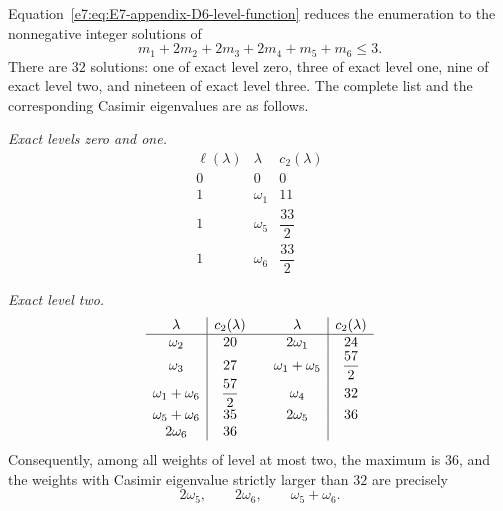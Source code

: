 \documentclass[11pt,reqno]{amsart}
\theoremstyle{definition}
\theoremstyle{remark}
\begin{document}
Equation~\eqref{e7:eq:E7-appendix-D6-level-function} reduces the enumeration
to the nonnegative integer solutions of
\[
  m_1+2m_2+2m_3+2m_4+m_5+m_6\le3.
\]
There are $32$ solutions: one of exact level zero, three of exact level
one, nine of exact level two, and nineteen of exact level three.  The
complete list and the corresponding Casimir eigenvalues are as follows.

\medskip\noindent\emph{Exact levels zero and one.}
\begin{equation*}
\begin{array}{c|c|c}
  \ell(\lambda)&\lambda&c_2(\lambda)\\
  \hline
  0&0&0\\
  1&\omega_1&11\\
  1&\omega_5&\dfrac{33}{2}\\[1mm]
  1&\omega_6&\dfrac{33}{2}
\end{array}
\end{equation*}

\medskip\noindent\emph{Exact level two.}
\begin{equation*}
\begin{array}{c|c@{\qquad}c|c}
  \lambda&c_2(\lambda)&\lambda&c_2(\lambda)\\
  \hline
  \omega_2&20
  &2\omega_1&24\\
  \omega_3&27
  &\omega_1+\omega_5&\dfrac{57}{2}\\[1mm]
  \omega_1+\omega_6&\dfrac{57}{2}
  &\omega_4&32\\
  \omega_5+\omega_6&35
  &2\omega_5&36\\
  2\omega_6&36
  &&
\end{array}
\end{equation*}
Consequently, among all weights of level at most two, the maximum is
$36$, and the weights with Casimir eigenvalue strictly larger than $32$
are precisely
\begin{equation*}
  2\omega_5,
  \qquad
  2\omega_6,
  \qquad
  \omega_5+\omega_6.
\end{equation*}
\end{document}
